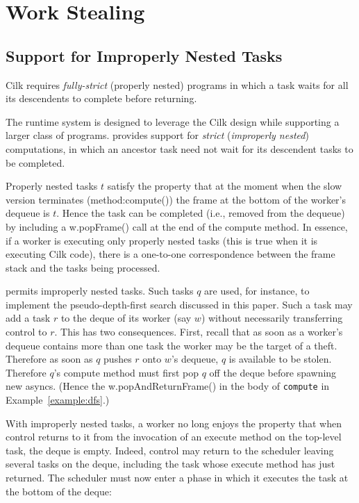 \section{\Xten{} Work Stealing}\label{sec:XWS}

\subsection{Support for Improperly Nested Tasks}
Cilk requires {\em fully-strict} (properly nested) programs in which a
task waits for all its descendents to complete before returning.

The \Xten{} runtime system is designed to leverage the Cilk design
while supporting a larger class of programs. \Xten{} provides support
for {\em strict} ({\em improperly nested}) computations, in which an
ancestor task need not wait for its descendent tasks to be completed.

Properly nested tasks $t$ satisfy the property that at the moment when
the slow version terminates (method:{\java compute()}) the frame at
the bottom of the worker's dequeue is $t$. Hence the task can be
completed (i.e., removed from the dequeue) by including a {\java
w.popFrame()} call at the end of the compute method. In essence, if a
worker is executing only properly nested tasks (this is true when it
is executing Cilk code), there is a one-to-one correspondence between
the frame stack and the tasks being processed.

\Xten{} permits improperly nested tasks. Such tasks $q$ are used, for
instance, to implement the pseudo-depth-first search discussed in this
paper. Such a task may add a task $r$ to the deque of its worker (say
$w$) without necessarily transferring control to $r$. This has two
consequences. First, recall that as soon as a worker's dequeue
contains more than one task the worker may be the target of a
theft. Therefore as soon as $q$ pushes $r$ onto $w$'s dequeue, $q$ is
available to be stolen.  Therefore $q$'s compute method must first pop
$q$ off the deque before spawning new asyncs. (Hence the {\java
w.popAndReturnFrame()} in the body of {\tt compute} in
Example~\ref{example:dfs}.)

With improperly nested tasks, a worker no long enjoys the property
that when control returns to it from the invocation of an execute
method on the top-level task, the deque is empty. Indeed, control may
return to the scheduler leaving several tasks on the deque, including
the task whose execute method has just returned. The scheduler must
now enter a phase in which it executes the task at the bottom of the
deque:

